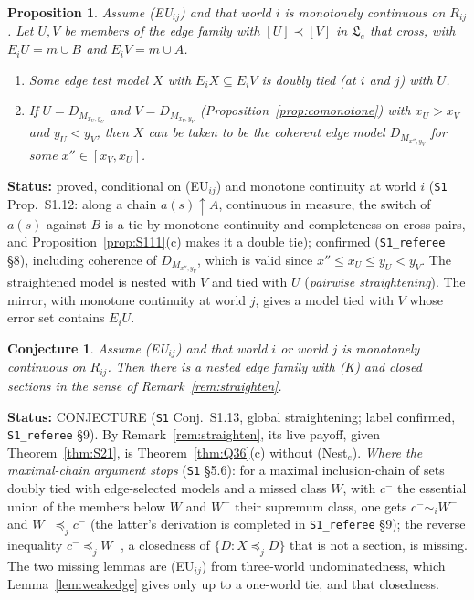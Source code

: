 \documentclass[11pt]{article}
\newtheorem{proposition}[theorem]{Proposition}
\newtheorem{conjecture}[theorem]{Conjecture}
\theoremstyle{definition}
\theoremstyle{remark}
\newcommand{\src}[1]{\texttt{#1}}
\newcommand{\status}[1]{\par\smallskip\noindent\textbf{Status:} #1\par\smallskip}
\begin{document}
\begin{proposition}\label{prop:S112}
Assume (EU$_{ij}$) and that world $i$ is monotonely continuous on $R_{ij}$. Let $U,V$ be members of the edge family with $[U]\prec[V]$ in $\mathfrak L_e$ that cross, with $E_iU=m\cup B$ and $E_iV=m\cup A$.
\begin{enumerate}[leftmargin=*,label=(\alph*)]
\item Some edge test model $X$ with $E_iX\subseteq E_iV$ is doubly tied (at $i$ and $j$) with $U$.
\item If $U=D_{M_{x_U,y_U}}$ and $V=D_{M_{x_V,y_V}}$ (Proposition~\ref{prop:comonotone}) with $x_U>x_V$ and $y_U<y_V$, then $X$ can be taken to be the coherent edge model $D_{M_{x'',y_V}}$ for some $x''\in[x_V,x_U]$.
\end{enumerate}
\end{proposition}
\status{proved, conditional on (EU$_{ij}$) and monotone continuity at world $i$ (\src{S1} Prop.~S1.12: along a chain $a(s)\uparrow A$, continuous in measure, the switch of $a(s)$ against $B$ is a tie by monotone continuity and completeness on cross pairs, and Proposition~\ref{prop:S111}(c) makes it a double tie); confirmed (\src{S1\_referee} \S8), including coherence of $D_{M_{x'',y_V}}$, which is valid since $x''\le x_U\le y_U<y_V$. The straightened model is nested with $V$ and tied with $U$ (\emph{pairwise straightening}). The mirror, with monotone continuity at world $j$, gives a model tied with $V$ whose error set contains $E_iU$.}

\begin{conjecture}\label{conj:S113}
Assume (EU$_{ij}$) and that world $i$ or world $j$ is monotonely continuous on $R_{ij}$. Then there is a nested edge family with (K) and closed sections in the sense of Remark~\ref{rem:straighten}.
\end{conjecture}
\status{CONJECTURE (\src{S1} Conj.~S1.13, global straightening; label confirmed, \src{S1\_referee} \S9). By Remark~\ref{rem:straighten}, its live payoff, given Theorem~\ref{thm:S21}, is Theorem~\ref{thm:Q36}(c) without (Nest$_e$). \emph{Where the maximal-chain argument stops} (\src{S1} \S5.6): for a maximal inclusion-chain of sets doubly tied with edge-selected models and a missed class $W$, with $c^-$ the essential union of the members below $W$ and $W^-$ their supremum class, one gets $c^-\sim_iW^-$ and $W^-\preceq_jc^-$ (the latter's derivation is completed in \src{S1\_referee} \S9); the reverse inequality $c^-\preceq_jW^-$, a closedness of $\{D:X\preceq_jD\}$ that is not a section, is missing. The two missing lemmas are (EU$_{ij}$) from three-world undominatedness, which Lemma~\ref{lem:weakedge} gives only up to a one-world tie, and that closedness.}
\end{document}
